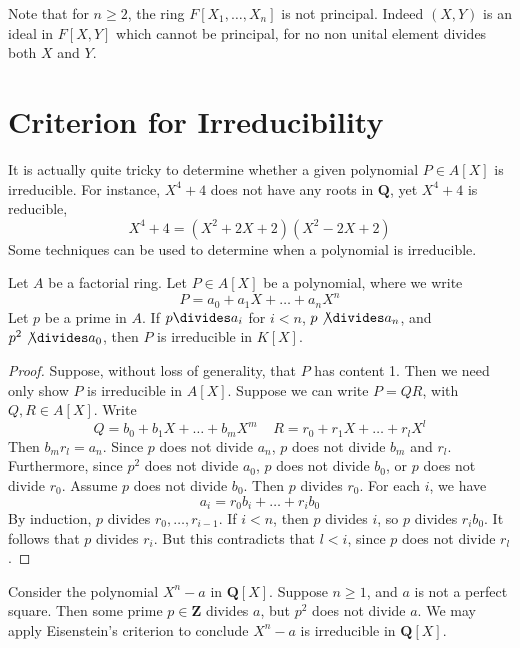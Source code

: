 Note that for $n \geq 2$, the ring $F[X_1, \dots, X_n]$ is not principal. Indeed $(X,Y)$ is an ideal in $F[X,Y]$ which cannot be principal, for no non unital element divides both $X$ and $Y$.





\section{Criterion for Irreducibility}

It is actually quite tricky to determine whether a given polynomial $P \in A[X]$ is irreducible. For instance, $X^4 + 4$ does not have any roots in $\mathbf{Q}$, yet $X^4 + 4$ is reducible,
%
\[ X^4 + 4 = (X^2 + 2X + 2)(X^2 - 2X + 2) \]
%
Some techniques can be used to determine when a polynomial is irreducible.

\begin{theorem}[Eisenstein]
    Let $A$ be a factorial ring. Let $P \in A[X]$ be a polynomial, where we write
    \[ P = a_0 + a_1 X + \dots + a_n X^n \]
    Let $p$ be a prime in $A$. If $p \divides a_i$ for $i < n$, $p \not \divides a_n$, and $p^2 \not \divides a_0$, then $P$ is irreducible in $K[X]$.
\end{theorem}
\begin{proof}
    Suppose, without loss of generality, that $P$ has content 1. Then we need only show $P$ is irreducible in $A[X]$. Suppose we can write $P = QR$, with $Q, R \in A[X]$. Write
    \[ Q = b_0 + b_1 X + \dots + b_m X^m\ \ \ \ \ R = r_0 + r_1 X + \dots + r_l X^l \]
    Then $b_m r_l = a_n$. Since $p$ does not divide $a_n$, $p$ does not divide $b_m$ and $r_l$. Furthermore, since $p^2$ does not divide $a_0$, $p$ does not divide $b_0$, or $p$ does not divide $r_0$. Assume $p$ does not divide $b_0$. Then $p$ divides $r_0$. For each $i$, we have
    \[ a_i = r_0 b_i + \dots + r_i b_0 \]
    By induction, $p$ divides $r_0, \dots, r_{i-1}$. If $i < n$, then $p$ divides $i$, so $p$ divides $r_i b_0$. It follows that $p$ divides $r_i$. But this contradicts that $l < i$, since $p$ does not divide $r_l$.
\end{proof}

\begin{example}
    Consider the polynomial $X^n - a$ in $\mathbf{Q}[X]$. Suppose $n \geq 1$, and $a$ is not a perfect square. Then some prime $p \in \mathbf{Z}$ divides $a$, but $p^2$ does not divide $a$. We may apply Eisenstein's criterion to conclude $X^n - a$ is irreducible in $\mathbf{Q}[X]$.
\end{example}

